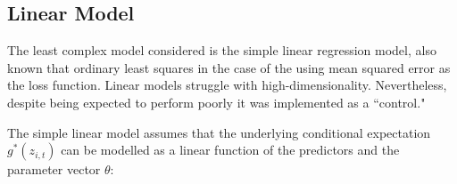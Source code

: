 \documentclass[a4paper, table]{article}
\begin{document}
%
%
%

\subsection{Linear Model}

The least complex model considered is the simple linear regression model, also known that ordinary least squares in the case of the using mean squared error as the loss function. Linear models struggle with high-dimensionality. Nevertheless, despite being expected to perform poorly it was implemented as a ``control."

The simple linear model assumes that the underlying conditional expectation \( g^*(z_{i, t}) \) can be modelled as a linear function of the predictors and the parameter vector \( \theta \):
\end{document}
